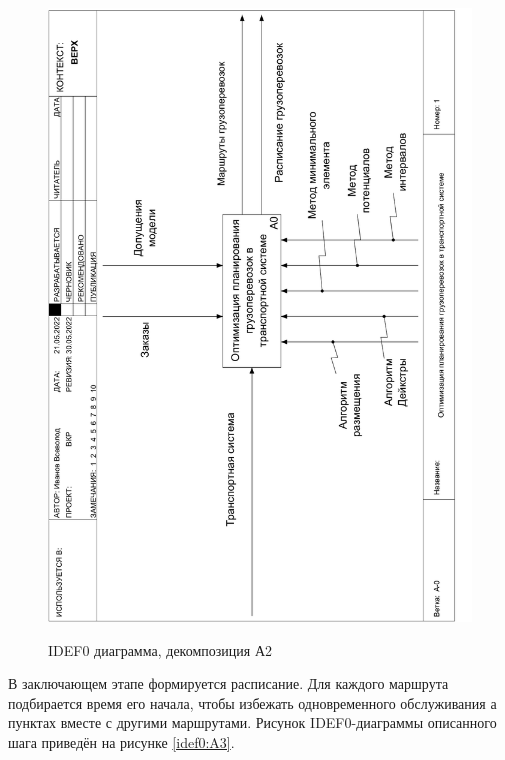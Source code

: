 \pagebreak
\begin{figure}[h]
	\begin{center}
		{\includegraphics[scale=0.63, angle=-90, page=4]{img/idef0/idef0.pdf}}
		\caption{IDEF0 диаграмма, декомпозиция А2}
		\label{idef0:A2}
	\end{center}
\end{figure}

В заключающем этапе формируется расписание. Для каждого маршрута подбирается время его начала, чтобы избежать одновременного обслуживания а пунктах вместе с другими маршрутами. Рисунок IDEF0-диаграммы описанного шага приведён на рисунке \ref{idef0:A3}.

